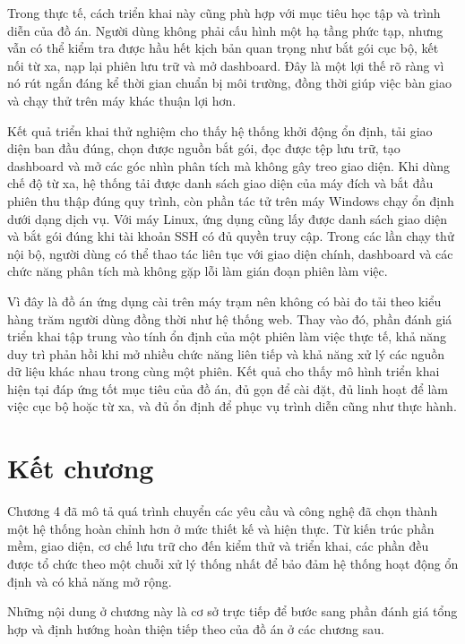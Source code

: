 \documentclass[../DoAn.tex]{subfiles}
\begin{document}
Trong thực tế, cách triển khai này cũng phù hợp với mục tiêu học tập và trình diễn của đồ án. Người dùng không phải cấu hình một hạ tầng phức tạp, nhưng vẫn có thể kiểm tra được hầu hết kịch bản quan trọng như bắt gói cục bộ, kết nối từ xa, nạp lại phiên lưu trữ và mở dashboard. Đây là một lợi thế rõ ràng vì nó rút ngắn đáng kể thời gian chuẩn bị môi trường, đồng thời giúp việc bàn giao và chạy thử trên máy khác thuận lợi hơn.

Kết quả triển khai thử nghiệm cho thấy hệ thống khởi động ổn định, tải giao diện ban đầu đúng, chọn được nguồn bắt gói, đọc được tệp lưu trữ, tạo dashboard và mở các góc nhìn phân tích mà không gây treo giao diện. Khi dùng chế độ từ xa, hệ thống tải được danh sách giao diện của máy đích và bắt đầu phiên thu thập đúng quy trình, còn phần tác tử trên máy Windows chạy ổn định dưới dạng dịch vụ. Với máy Linux, ứng dụng cũng lấy được danh sách giao diện và bắt gói đúng khi tài khoản SSH có đủ quyền truy cập. Trong các lần chạy thử nội bộ, người dùng có thể thao tác liên tục với giao diện chính, dashboard và các chức năng phân tích mà không gặp lỗi làm gián đoạn phiên làm việc.

Vì đây là đồ án ứng dụng cài trên máy trạm nên không có bài đo tải theo kiểu hàng trăm người dùng đồng thời như hệ thống web. Thay vào đó, phần đánh giá triển khai tập trung vào tính ổn định của một phiên làm việc thực tế, khả năng duy trì phản hồi khi mở nhiều chức năng liên tiếp và khả năng xử lý các nguồn dữ liệu khác nhau trong cùng một phiên. Kết quả cho thấy mô hình triển khai hiện tại đáp ứng tốt mục tiêu của đồ án, đủ gọn để cài đặt, đủ linh hoạt để làm việc cục bộ hoặc từ xa, và đủ ổn định để phục vụ trình diễn cũng như thực hành.

\section{Kết chương}
Chương 4 đã mô tả quá trình chuyển các yêu cầu và công nghệ đã chọn thành một hệ thống hoàn chỉnh hơn ở mức thiết kế và hiện thực. Từ kiến trúc phần mềm, giao diện, cơ chế lưu trữ cho đến kiểm thử và triển khai, các phần đều được tổ chức theo một chuỗi xử lý thống nhất để bảo đảm hệ thống hoạt động ổn định và có khả năng mở rộng.

Những nội dung ở chương này là cơ sở trực tiếp để bước sang phần đánh giá tổng hợp và định hướng hoàn thiện tiếp theo của đồ án ở các chương sau.
\end{document}
